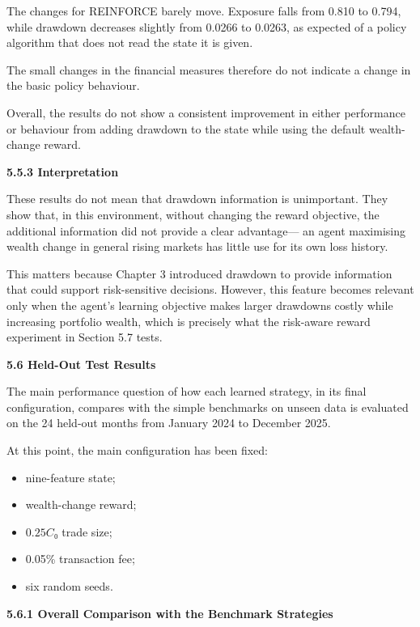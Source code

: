 The changes for REINFORCE barely move. Exposure falls from 0.810 to
0.794, while drawdown decreases slightly from 0.0266 to 0.0263, as
expected of a policy algorithm that does not read the state it is given.

The small changes in the financial measures therefore do not indicate a
change in the basic policy behaviour.

Overall, the results do not show a consistent improvement in either
performance or behaviour from adding drawdown to the state while using
the default wealth-change reward.

\textbf{5.5.3 Interpretation}

These results do not mean that drawdown information is unimportant. They
show that, in this environment, without changing the reward objective,
the additional information did not provide a clear advantage--- an agent
maximising wealth change in general rising markets has little use for
its own loss history.

This matters because Chapter 3 introduced drawdown to provide
information that could support risk-sensitive decisions. However, this
feature becomes relevant only when the agent's learning objective makes
larger drawdowns costly while increasing portfolio wealth, which is
precisely what the risk-aware reward experiment in Section 5.7 tests.

\textbf{5.6 Held-Out Test Results}

The main performance question of how each learned strategy, in its final
configuration, compares with the simple benchmarks on unseen data is
evaluated on the 24 held-out months from January 2024 to December 2025.

At this point, the main configuration has been fixed:

\begin{itemize}
\item
  nine-feature state;
\item
  wealth-change reward;
\item
  \(0.25C₀\) trade size;
\item
  0.05\% transaction fee;
\item
  six random seeds.
\end{itemize}

\textbf{5.6.1 Overall Comparison with the Benchmark Strategies}

